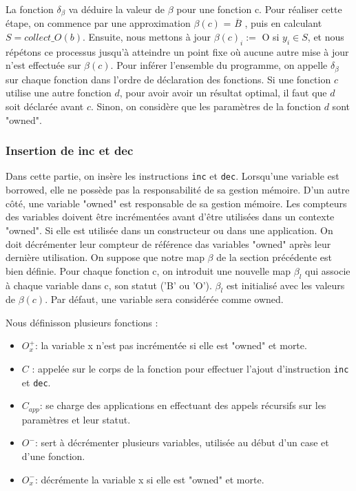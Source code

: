 \documentclass{rapportECL}
\begin{document}
La fonction $\delta_{\beta}$ va déduire la valeur de $\beta$ pour une fonction c. 
Pour réaliser cette étape, on commence par une approximation $\beta(c)$ = $\overline{B}$ , puis en calculant $S = collect\_O(b)$. 
Ensuite, nous mettons à jour  $\beta(c)_i :=$ O  si $y_i \in S $, et nous répétons ce processus jusqu'à atteindre un point fixe où aucune autre mise à jour 
n'est effectuée sur $\beta(c)$.
Pour inférer l'ensemble du programme, on appelle $\delta_{\beta}$ sur chaque fonction dans l'ordre de déclaration des fonctions. 
Si une fonction $c$ utilise une autre fonction $d$, pour avoir avoir un résultat optimal, il faut que $d$ soit déclarée avant $c$. 
Sinon, on considère que les paramètres de la fonction $d$ sont "owned".


\subsubsection{Insertion de inc et dec}
Dans cette partie, on insère les instructions \verb|inc| et \verb|dec|.
Lorsqu'une variable est borrowed, elle ne possède pas la responsabilité de sa gestion mémoire. 
D'un autre côté, une variable "owned" est responsable de sa gestion mémoire.
Les compteurs des variables doivent être incrémentées avant d'être utilisées dans un contexte "owned". 
Si elle est utilisée dans un constructeur ou dans une application.
On doit décrémenter leur compteur de référence das variables "owned" après leur dernière utilisation. 
On suppose que notre map $\beta$ de la section précédente est bien définie. 
Pour chaque fonction c, on introduit une nouvelle map $\beta_l$ qui associe à chaque variable dans c, son statut ('B' ou 'O'). 
$\beta_l$ est initialisé avec les valeurs de $\beta(c)$. Par défaut, une variable sera considérée comme owned.

Nous définisson plusieurs fonctions :
\begin{itemize}
    \item $O_x^{+}$: la variable x n'est pas incrémentée si elle est "owned" et morte.
    \item $C$ : appelée sur le corps de la fonction pour effectuer l'ajout d'instruction \verb|inc| et \verb|dec|.
    \item $C_{app}$: se charge des applications en effectuant des appels récursifs sur les paramètres et leur statut.
    \item $O^{-}$: sert à décrémenter plusieurs variables, utilisée au début d'un case et d'une fonction.
    \item  $O_x^{-}$: décrémente la variable x si elle est "owned" et morte.   
\end{itemize}
\end{document}
